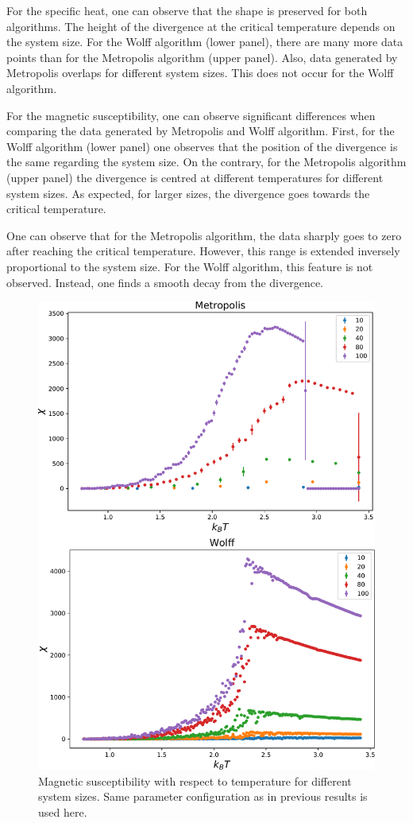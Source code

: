 \documentclass[pra,aps,superscriptaddress,amssymb,amsmath,reprint,noeprint,floatfix]{revtex4-2}
\begin{document}
For the specific heat, one can observe that the shape is preserved for both algorithms. The height of the divergence at the critical temperature depends on the system size. For the Wolff algorithm (lower panel), there are many more data points than for the Metropolis algorithm (upper panel). Also, data generated by Metropolis overlaps for different system sizes. This does not occur for the Wolff algorithm. 

For the magnetic susceptibility, one can observe significant differences when comparing the data generated by Metropolis and Wolff algorithm. First, for the Wolff algorithm (lower panel) one observes that the position of the divergence is the same regarding the system size. On the contrary, for the Metropolis algorithm (upper panel) the divergence is centred at different temperatures for different system sizes. As expected, for larger sizes, the divergence goes towards the critical temperature.

One can observe that for the Metropolis algorithm, the data sharply goes to zero after reaching the critical temperature. However, this range is extended inversely proportional to the system size. For the Wolff algorithm, this feature is not observed. Instead, one finds a smooth decay from the divergence. 
\begin{figure}[H]
    \centering
    \includegraphics[width=0.8\linewidth]{Figures/susc.pdf}
    \caption{Magnetic susceptibility with respect to temperature for different system sizes. Same parameter configuration as in previous results is used here.}
    \label{fig:susc}
\end{figure}
\end{document}
